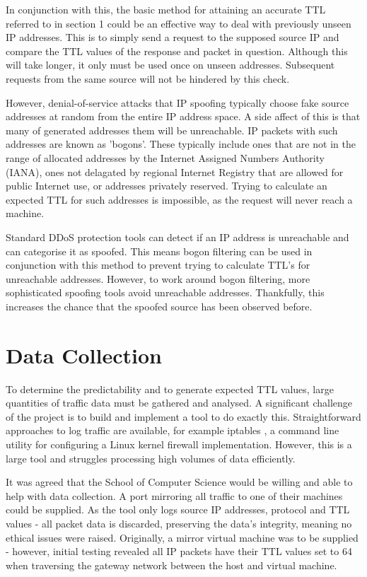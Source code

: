 \documentclass[twocolumn,10pt]{asme2ej}
\begin{document}
In conjunction with this, the basic method for attaining an accurate TTL referred to in section 1 could be an effective way to deal with previously unseen IP addresses. This is to simply send a request to the supposed source IP and compare the TTL values of the response and packet in question. Although this will take longer, it only must be used once on unseen addresses. Subsequent requests from the same source will not be hindered by this check.

However, denial-of-service attacks that IP spoofing typically choose fake source addresses at random from the entire IP address space. A side affect of this is that many of generated addresses them will be unreachable. IP packets with such addresses are known as 'bogons'. These typically include ones that are not in the range of allocated addresses by the Internet Assigned Numbers Authority (IANA), ones not delagated by regional Internet Registry that are allowed for public Internet use, or addresses privately reserved\cite{rfc1918}. Trying to calculate an expected TTL for such addresses is impossible, as the request will never reach a machine.

Standard DDoS protection tools can detect if an IP address is unreachable and can categorise it as spoofed. This means bogon filtering can be used in conjunction with this method to prevent trying to calculate TTL's for unreachable addresses. However, to work around bogon filtering, more sophisticated spoofing tools avoid unreachable addresses. Thankfully, this increases the chance that the spoofed source has been observed before.

\section{Data Collection}

To determine the predictability and to generate expected TTL values, large quantities of traffic data must be gathered and analysed. A significant challenge of the project is to build and implement a tool to do exactly this. Straightforward approaches to log traffic are available, for example iptables \cite{iptables}, a command line utility for configuring a Linux kernel firewall implementation. However, this is a large tool and struggles processing high volumes of data efficiently.

It was agreed that the School of Computer Science would be willing and able to help with data collection. A port mirroring all traffic to one of their machines could be supplied. As the tool only logs source IP addresses, protocol and TTL values - all packet data is discarded, preserving the data's integrity, meaning no ethical issues were raised. Originally, a mirror virtual machine was to be supplied - however, initial testing revealed all IP packets have their TTL values set to 64 when traversing the gateway network between the host and virtual machine.
\end{document}
